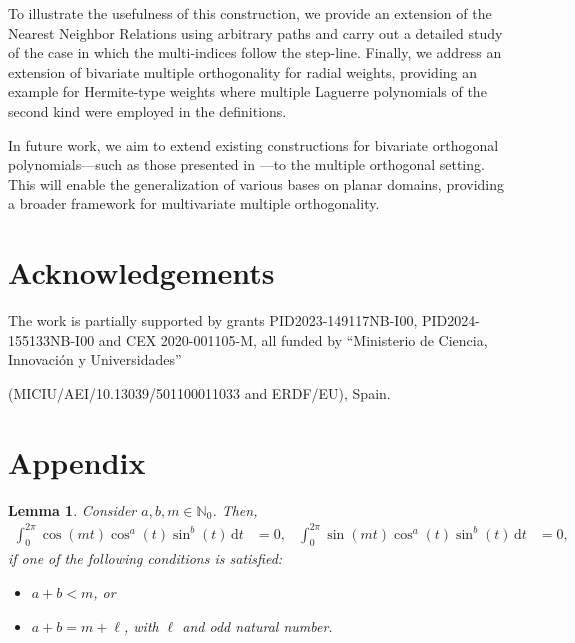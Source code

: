 \documentclass[a4paper]{article}
\theoremstyle{plain}
\newtheorem{lemma}[theorem]{Lemma}
\theoremstyle{definition}
\newcommand{\NN}{\mathbb{N}}
\newcommand{\dr}{\mathrm{d}}
\begin{document}
    To illustrate the usefulness of this construction, we provide an extension of the Nearest Neighbor Relations using arbitrary paths and carry out a detailed study of the case in which the multi-indices follow the step-line. Finally, we address an extension of bivariate multiple orthogonality for radial weights, providing an example for Hermite-type weights where multiple Laguerre polynomials of the second kind were employed in the definitions.

    In future work, we aim to extend existing constructions for bivariate orthogonal polynomials—such as those presented in \cite[Section 2.6.1]{DX14}—to the multiple orthogonal setting. This will enable the generalization of various bases on planar domains, providing a broader framework for multivariate multiple orthogonality.
    
	\section*{Acknowledgements}

    The work is partially supported by grants PID2023-149117NB-I00, PID2024-155133NB-I00 and CEX
    2020-001105-M, all funded by ``Ministerio de Ciencia, Innovación y Universidades'' 
    
    \noindent(MICIU/AEI/10.13039/501100011033 and ERDF/EU), Spain.

       
	
    {}

    \newpage
	
	\appendix

    \section{Appendix}\label{sec:appendix}

    \begin{lemma}
    \label{lemma:trig-integrals}
        Consider $a,b,m\in\NN_0$. Then,
        \begin{align}
        \label{eq:trig-integrals}
            \int_0^{2\pi}\cos(mt) \cos^a(t) \sin^b(t)\, \dr t &=0, & 
            \int_0^{2\pi}\sin(mt) \cos^a(t) \sin^b(t)\, \dr t &=0,
        \end{align}
        if one of the following conditions is satisfied:
        \begin{itemize}
            \item $a+b<m$, or
            \item $a+b = m+\ell$, with $\ell$ and odd natural number. 
        \end{itemize}
    \end{lemma}
    
\end{document}
